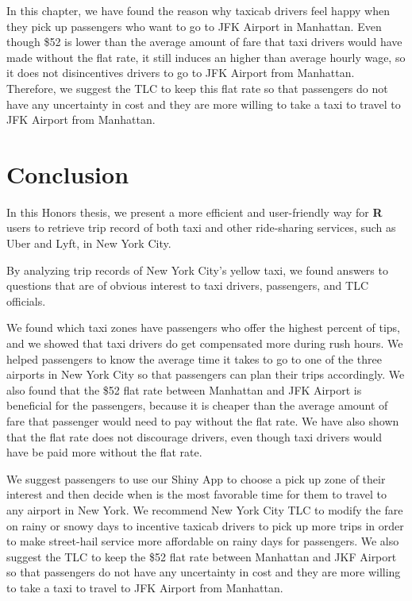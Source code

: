 \documentclass[12pt,twoside]{reedthesis}
\theoremstyle{definition}
\theoremstyle{definition}
\theoremstyle{definition}
\theoremstyle{remark}
\begin{document}
In this chapter, we have found the reason why taxicab drivers feel happy
when they pick up passengers who want to go to JFK Airport in Manhattan.
Even though \$52 is lower than the average amount of fare that taxi
drivers would have made without the flat rate, it still induces an
higher than average hourly wage, so it does not disincentives drivers to
go to JFK Airport from Manhattan. Therefore, we suggest the TLC to keep
this flat rate so that passengers do not have any uncertainty in cost
and they are more willing to take a taxi to travel to JFK Airport from
Manhattan.

\chapter{Conclusion}\label{chapter6}

In this Honors thesis, we present a more efficient and user-friendly way
for \textbf{R} users to retrieve trip record of both taxi and other
ride-sharing services, such as Uber and Lyft, in New York City.

By analyzing trip records of New York City's yellow taxi, we found
answers to questions that are of obvious interest to taxi drivers,
passengers, and TLC officials.

We found which taxi zones have passengers who offer the highest percent
of tips, and we showed that taxi drivers do get compensated more during
rush hours. We helped passengers to know the average time it takes to go
to one of the three airports in New York City so that passengers can
plan their trips accordingly. We also found that the \$52 flat rate
between Manhattan and JFK Airport is beneficial for the passengers,
because it is cheaper than the average amount of fare that passenger
would need to pay without the flat rate. We have also shown that the
flat rate does not discourage drivers, even though taxi drivers would
have be paid more without the flat rate.

We suggest passengers to use our Shiny App to choose a pick up zone of
their interest and then decide when is the most favorable time for them
to travel to any airport in New York. We recommend New York City TLC to
modify the fare on rainy or snowy days to incentive taxicab drivers to
pick up more trips in order to make street-hail service more affordable
on rainy days for passengers. We also suggest the TLC to keep the \$52
flat rate between Manhattan and JKF Airport so that passengers do not
have any uncertainty in cost and they are more willing to take a taxi to
travel to JFK Airport from Manhattan.
\end{document}
